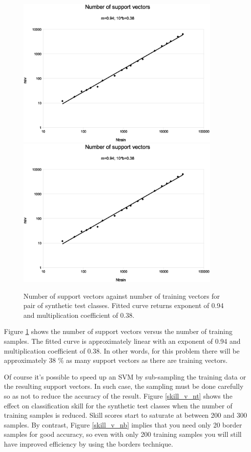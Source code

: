 \begin{figure}
  \ifsubmit
    \includegraphics[width=0.9\textwidth]{nsv}
  \else
    \includegraphics[width=0.9\textwidth]{../nsv}
  \fi
\caption{Number of support vectors against number of training vectors for pair of synthetic test classes. Fitted curve returns exponent of 0.94 and multiplication coefficient of 0.38.}
\label{nsv}
\end{figure}

Figure \ref{nsv} shows the number of support vectors versus the
number of training samples. The fitted curve is approximately linear 
with an exponent of 0.94 and multiplication coefficient of 0.38.
In other words, for this problem there will be approximately 38 \% as many 
support vectors as there are training vectors.

Of course it's possible to speed up an SVM by sub-sampling the training data
or the resulting support vectors.
In such case, the sampling must be done carefully so as not to reduce the
accuracy of the result.
Figure \ref{skill_v_nt} shows the effect on classification skill for the
synthetic test classes when the number of training samples is reduced.
Skill scores start to saturate at between 200 and 300 samples.
By contrast, Figure \ref{skill_v_nb} implies that you need only 20 border samples
for good accuracy, so even with only 200 training samples you will still
have improved efficiency by using the borders technique.

